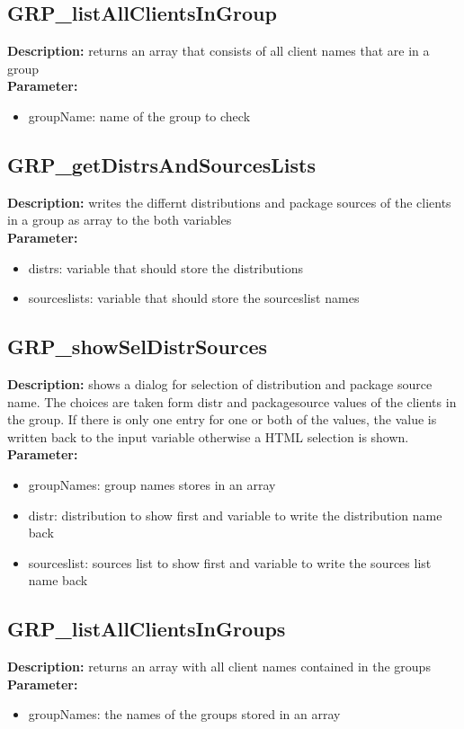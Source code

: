 \subsection{GRP\_listAllClientsInGroup}
\textbf{Description:} returns an array that consists of all client names that are in a group\\
\textbf{Parameter:}
\begin{itemize}
\item groupName: name of the group to check
\end{itemize}

\subsection{GRP\_getDistrsAndSourcesLists}
\textbf{Description:} writes the differnt distributions and package sources of the clients in a group as array to the both variables\\
\textbf{Parameter:}
\begin{itemize}
\item distrs: variable that should store the distributions
\item sourceslists: variable that should store the sourceslist names
\end{itemize}

\subsection{GRP\_showSelDistrSources}
\textbf{Description:} shows a dialog for selection of distribution and package source name. The choices are taken form distr and packagesource values of the clients in the group. If there is only one entry for one or both of the values, the value is written back to the input variable otherwise a HTML selection is shown.\\
\textbf{Parameter:}
\begin{itemize}
\item groupNames: group names stores in an array
\item distr: distribution to show first and variable to write the distribution name back
\item sourceslist: sources list to show first and variable to write the sources list name back
\end{itemize}

\subsection{GRP\_listAllClientsInGroups}
\textbf{Description:} returns an array with all client names contained in the groups\\
\textbf{Parameter:}
\begin{itemize}
\item groupNames: the names of the groups stored in an array
\end{itemize}


